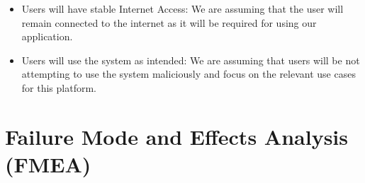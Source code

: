 \documentclass[12pt]{article}
\begin{document}
\begin{itemize}
    \item Users will have stable Internet Access: We are assuming that the user will remain connected to the internet as it will be required for using our application.
    \item Users will use the system as intended: We are assuming that users will be not attempting to use the system maliciously and focus on the relevant use cases for this platform.
\end{itemize}

\section{Failure Mode and Effects Analysis (FMEA)}
\end{document}

